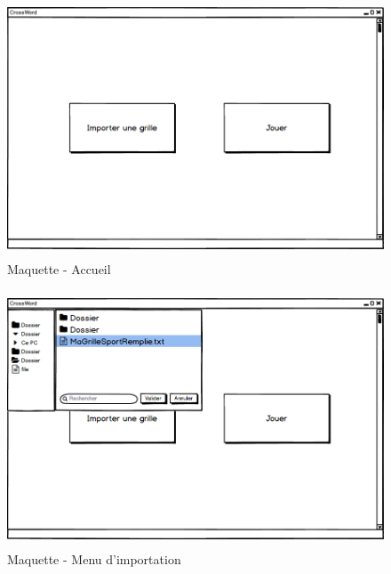 \documentclass [ 11 pt ] {article}
\begin{document}
    \begin{figure}[H]
    \begin{center}
        \includegraphics[height=3in]{Maquettes/Accueil.png}
        \caption{Maquette - Accueil} 
        \end{center}
    \end{figure}
    
        \begin{figure}[H]
    \begin{center}
        \includegraphics[height=3in]{Maquettes/Import.png}
        \caption{Maquette - Menu d'importation} 
        \end{center}
    \end{figure}
    
\end{document}
